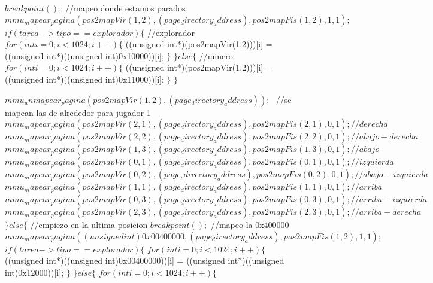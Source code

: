 \begin{algorithmic}
  \State \tab \tab \tab $   breakpoint();$
    //mapeo donde estamos parados
  \State \tab \tab \tab $   mmu_mapear_pagina(pos2mapVir(1,2), (page_directory_address), pos2mapFis(1,2), 1, 1);$
  \State \tab \tab \tab $   if (tarea->tipo == explorador) \{$
      //explorador
      \State \tab \tab \tab \tab $ for (int i = 0; i < 1024; i++) \{$
        ((unsigned int*)(pos2mapVir(1,2)))[i] = ((unsigned int*)((unsigned int)0x10000))[i];
      \State \tab \tab \tab \tab $ \}$
  \State \tab \tab \tab $   \} else \{$
      //minero
      \State \tab \tab \tab \tab $ for (int i = 0; i < 1024; i++) \{$
        ((unsigned int*)(pos2mapVir(1,2)))[i] = ((unsigned int*)((unsigned int)0x11000))[i];
     \State \tab \tab \tab \tab $  \}$
  \State \tab \tab \tab $   \}$

  \State \tab \tab \tab $   mmu_unmapear_pagina(pos2mapVir(1,2), (page_directory_address));$
\State \tab \tab \tab $ $
    //se mapean las de alrededor para jugador 1
  \State \tab \tab \tab $   mmu_mapear_pagina(pos2mapVir(2,1), (page_directory_address), pos2mapFis(2,1), 0, 1);//derecha$
  \State \tab \tab \tab $   mmu_mapear_pagina(pos2mapVir(2,2), (page_directory_address), pos2mapFis(2,2), 0, 1);//abajo-derecha$
  \State \tab \tab \tab $   mmu_mapear_pagina(pos2mapVir(1,3), (page_directory_address), pos2mapFis(1,3), 0, 1);//abajo$
  \State \tab \tab \tab $   mmu_mapear_pagina(pos2mapVir(0,1), (page_directory_address), pos2mapFis(0,1), 0, 1);//izquierda$
  \State \tab \tab \tab $   mmu_mapear_pagina(pos2mapVir(0,2), (page_cdirectory_address), pos2mapFis(0,2), 0, 1);//abajo-izquierda$
  \State \tab \tab \tab $   mmu_mapear_pagina(pos2mapVir(1,1), (page_directory_address), pos2mapFis(1,1), 0, 1);//arriba$
  \State \tab \tab \tab $   mmu_mapear_pagina(pos2mapVir(0,3), (page_directory_address), pos2mapFis(0,3), 0, 1);//arriba-izquierda$
  \State \tab \tab \tab $   mmu_mapear_pagina(pos2mapVir(2,3), (page_directory_address), pos2mapFis(2,3), 0, 1);//arriba-derecha$
 \State \tab \tab $ \} else \{$
    //empiezo en la ultima posicion
  \State \tab \tab \tab $   breakpoint();$
    //mapeo la 0x400000
  \State \tab \tab \tab $   mmu_mapear_pagina((unsigned int)0x00400000, (page_directory_address), pos2mapFis(1,2), 1, 1);$
  \State \tab \tab \tab $   if (tarea->tipo == explorador) \{$
      \State \tab \tab \tab \tab $ for (int i = 0; i < 1024; i++) \{$
        ((unsigned int*)((unsigned int)0x00400000))[i] = ((unsigned int*)((unsigned int)0x12000))[i];
      \State \tab \tab \tab \tab $ \}$
  \State \tab \tab \tab $   \} else \{$
      \State \tab \tab \tab \tab $  for (int i = 0; i < 1024; i++) \{$

\end{algorithmic}
